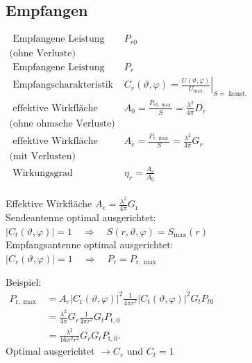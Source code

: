 \documentclass[english]{latex4ei/latex4ei_sheet}
\begin{document}
\begin{sectionbox}
\subsection{Empfangen}
$\begin{array}{ll}
	\text { Empfangene Leistung } & P_{r 0} \\  
	\text{(ohne Verluste)}	&\\
	\text { Empfangene Leistung } & P_{r} \\ 
	\text { Empfangscharakteristik } & C_{r}(\vartheta, \varphi)=\left.\frac{U(\vartheta, \varphi)}{U_{\max }}\right|_{S=\text { konst. }} \\
	\text { effektive Wirkfläche } & A_{0}=\frac{P_{r 0, \max }}{S}=\frac{\lambda^{2}}{4 \pi} D_{r} \\
	\text{(ohne ohmsche Verluste)}	&\\ 
	\text { effektive Wirkfläche } & A_{e}=\frac{P_{r, \max }}{S}=\frac{\lambda^{2}}{4 \pi} G_{r} \\  
	\text{(mit Verlusten)}&\\
	 \text { Wirkungsgrad} & \eta_{r}=\frac{A_{e}}{A_{0}} \\
\end{array}$

\end{sectionbox}
\begin{sectionbox}

\begin{emphbox}
\begin{flushleft}
Effektive Wirkfläche 	$A_{e}=\frac{\lambda^{2}}{4 \pi}G_{\mathrm{r}}$\\
Sendeantenne optimal ausgerichtet:\\
$\left|C_{t}(\vartheta, \varphi)\right|=1 \quad \Rightarrow \quad S(r, \vartheta, \varphi)=S_{\max }(r)$\\
Empfangsantenne optimal ausgerichtet:\\
$\left|C_{r}(\vartheta, \varphi)\right|=1 \quad \Rightarrow \quad P_{\mathrm{r}}=P_{\mathrm{r}, \max }$
\end{flushleft}
\end{emphbox}
\end{sectionbox}
\begin{sectionbox}
	Beispiel: \\
	$\begin{aligned} P_{\mathrm{r}, \max } &=A_{e}\left|C_{\mathrm{r}}(\vartheta, \varphi)\right|^{2} \frac{1}{4 \pi r^{2}}\left|C_{\mathrm{t}}(\vartheta, \varphi)\right|^{2} G_{t} P_{t 0}\\ 
		&=\frac{\lambda^{2}}{4 \pi} G_{r} \frac{1}{4 \pi r^{2}} G_{t} P_{\mathrm{t}, 0} \\
		&=\frac{\lambda^{2}}{16 \pi^{2} r^{2}} G_{r} G_{t} P_{\mathrm{t}, 0} . \end{aligned}$\\
	Optimal ausgerichtet $\rightarrow C_r$ und $C_t=1$
\end{sectionbox}
\end{document}

